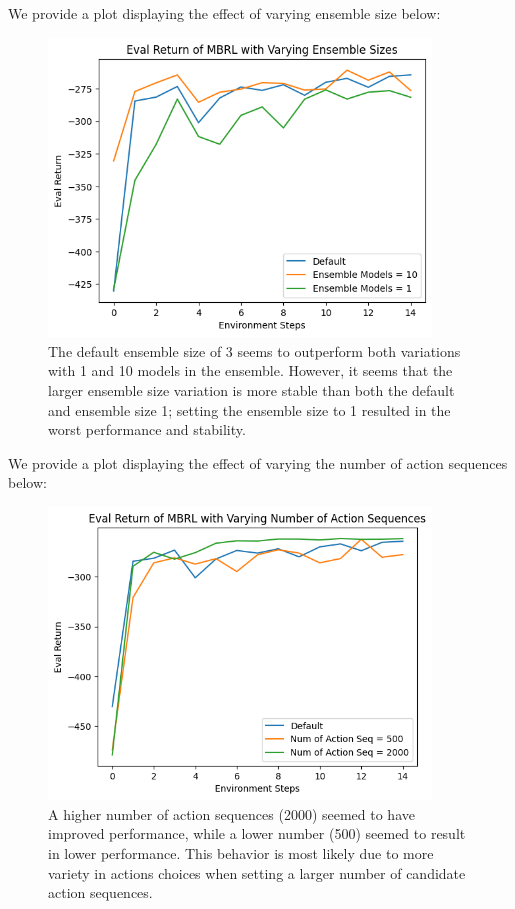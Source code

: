 \documentclass{article} %
\begin{document}
\begin{sol}
  We provide a plot displaying the effect of varying ensemble size below:
  \begin{figure}[ht!]
    \color{darkblue}
  \begin{center}
    \includegraphics[width=4in]{images/q4/ensemble.png}
  \end{center}
  \caption{The default ensemble size of 3 seems to outperform both variations with 1 and 10 models in the ensemble. However, it seems that the larger ensemble size variation is more stable than both the default and ensemble size 1; setting the ensemble size to 1 resulted in the worst performance and stability.}
  \end{figure}

  \newpage
  We provide a plot displaying the effect of varying the number of action sequences below:
  \begin{figure}[ht!]
    \color{darkblue}
  \begin{center}
    \includegraphics[width=4in]{images/q4/acseqs.png}
  \end{center}
  \caption{A higher number of action sequences (2000) seemed to have improved performance, while a lower number (500) seemed to result in lower performance. This behavior is most likely due to more variety in actions choices when setting a larger number of candidate action sequences.}
\end{figure}


\end{sol}
\end{document}
